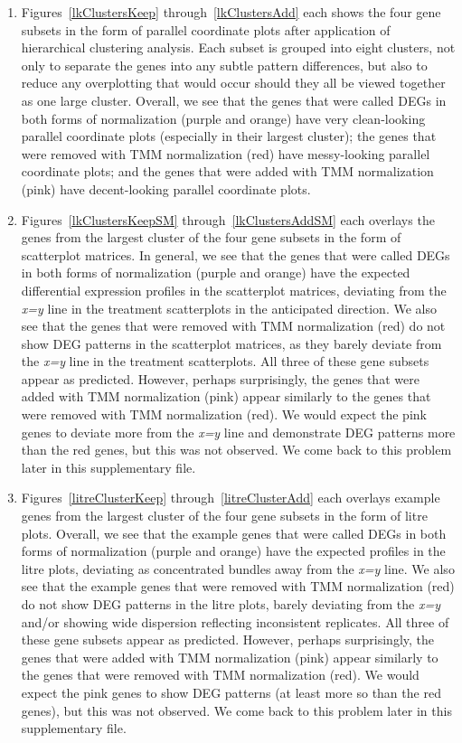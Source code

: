 \documentclass[11pt,a4paper,oldfontcommands,openany]{memoir}
\numberwithin{equation}{section} %
\begin{document}
\begin{enumerate}

\item Figures~\ref{lkClustersKeep} through~\ref{lkClustersAdd} each shows the four gene subsets in the form of parallel coordinate plots after application of hierarchical clustering analysis. Each subset is grouped into eight clusters, not only to separate the genes into any subtle pattern differences, but also to reduce any overplotting that would occur should they all be viewed together as one large cluster. Overall, we see that the genes that were called DEGs in both forms of normalization (purple and orange) have very clean-looking parallel coordinate plots (especially in their largest cluster); the genes that were removed with TMM normalization (red) have messy-looking parallel coordinate plots; and the genes that were added with TMM normalization (pink) have decent-looking parallel coordinate plots.

\item Figures~\ref{lkClustersKeepSM} through~\ref{lkClustersAddSM} each overlays the genes from the largest cluster of the four gene subsets in the form of scatterplot matrices. In general, we see that the genes that were called DEGs in both forms of normalization (purple and orange) have the expected differential expression profiles in the scatterplot matrices, deviating from the \textit{x=y} line in the treatment scatterplots in the anticipated direction. We also see that the genes that were removed with TMM normalization (red) do not show DEG patterns in the scatterplot matrices, as they barely deviate from the \textit{x=y} line in the treatment scatterplots. All three of these gene subsets appear as predicted. However, perhaps surprisingly, the genes that were added with TMM normalization (pink) appear similarly to the genes that were removed with TMM normalization (red). We would expect the pink genes to deviate more from the \textit{x=y} line and demonstrate DEG patterns more than the red genes, but this was not observed. We come back to this problem later in this supplementary file.

\item Figures~\ref{litreClusterKeep} through~\ref{litreClusterAdd} each overlays example genes from the largest cluster of the four gene subsets in the form of litre plots. Overall, we see that the example genes that were called DEGs in both forms of normalization (purple and orange) have the expected profiles in the litre plots, deviating as concentrated bundles away from the \textit{x=y} line. We also see that the example genes that were removed with TMM normalization (red) do not show DEG patterns in the litre plots, barely deviating from the \textit{x=y} and/or showing wide dispersion reflecting inconsistent replicates. All three of these gene subsets appear as predicted. However, perhaps surprisingly, the genes that were added with TMM normalization (pink) appear similarly to the genes that were removed with TMM normalization (red). We would expect the pink genes to show DEG patterns (at least more so than the red genes), but this was not observed. We come back to this problem later in this supplementary file.


\end{enumerate}
\end{document}
